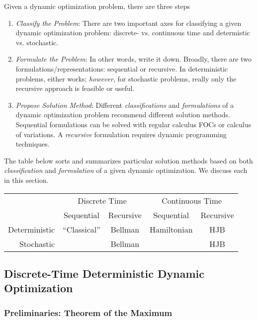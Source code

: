 \documentclass[12pt]{article}
\numberwithin{equation}{section} %
\theoremstyle{plain}
\theoremstyle{definition}
\theoremstyle{remark}
\begin{document}
Given a dynamic optimization problem, there are three steps
\begin{enumerate}[label=(\roman*)]
  \item \emph{Classify the Problem}:
    There are two important axes for classifying a given dynamic
    optimization problem: discrete- vs. continuous time and determistic
    vs. stochastic.
  \item \emph{Formulate the Problem}: In other words, write it down.
    Broadly, there are two formulations/representations: sequential or
    recursive.
    In deterministic problems, either works; \emph{however}, for
    stochastic problems, really only the recursive approach is feasible
    or useful.
  \item \emph{Propose Solution Method}:
    Different \emph{classifications} and \emph{formulations} of a
    dynamic optimization problem recommend different solution methods.
    Sequential formulations can be solved with regular calculus FOCs or
    calculus of variations. A \emph{recursive} formulation requires
    dynamic programming techniques.
\end{enumerate}
The table below sorts and summarizes particular solution methods based
on both \emph{classification} and \emph{formulation} of a given dynamic
optimization. We discuss each in this section.
\begin{table}[htbp!]
\centering
\begin{tabular}{|r|cc|cc|}
  \hline
  & \multicolumn{2}{c}{Discrete Time}
  & \multicolumn{2}{|c|}{Continuous Time} \\\cline{2-3}\cline{4-5}
  & Sequential & Recursive & Sequential & Recursive \\\hline\hline
  Deterministic & ``Classical'' & Bellman & Hamiltonian & HJB \\\hline
  Stochastic & &Bellman & &HJB \\\hline
\end{tabular}
\end{table}



\subsection{Discrete-Time Deterministic Dynamic Optimization}
\label{sec:discrete-dynamic}

\subsubsection{Preliminaries: Theorem of the Maximum}
\end{document}
